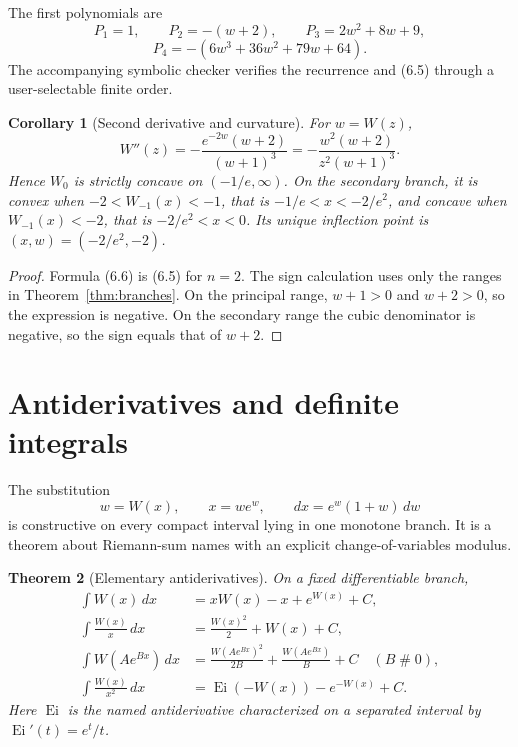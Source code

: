 \documentclass[11pt]{article}
\newtheorem{theorem}{Theorem}[section]
\newtheorem{corollary}[theorem]{Corollary}
\theoremstyle{definition}
\newcommand{\apart}{\mathrel{\#}}
\newcommand{\Ei}{\operatorname{Ei}}
\begin{document}
The first polynomials are
\[
 P_1=1,\qquad P_2=-(w+2),\qquad
 P_3=2w^2+8w+9,
\]
\[
 P_4=-(6w^3+36w^2+79w+64).
\]
The accompanying symbolic checker verifies the recurrence and (6.5) through a
user-selectable finite order.

\begin{corollary}[Second derivative and curvature]\label{cor:curvature}
For \(w=W(z)\),
\[
 W''(z)=-\frac{e^{-2w}(w+2)}{(w+1)^3}
       =-\frac{w^2(w+2)}{z^2(w+1)^3}.
 \tag{6.6}
\]
Hence \(W_0\) is strictly concave on \((-1/e,\infty)\).  On the secondary
branch, it is convex when \(-2<W_{-1}(x)<-1\), that is
\(-1/e<x<-2/e^2\), and concave when
\(W_{-1}(x)<-2\), that is \(-2/e^2<x<0\).  Its unique inflection point is
\((x,w)=(-2/e^2,-2)\).
\end{corollary}

\begin{proof}
Formula (6.6) is (6.5) for \(n=2\).  The sign calculation uses only the
ranges in Theorem~\ref{thm:branches}.  On the principal range, \(w+1>0\) and
\(w+2>0\), so the expression is negative.  On the secondary range the cubic
denominator is negative, so the sign equals that of \(w+2\).
\end{proof}

\section{Antiderivatives and definite integrals}\label{sec:integrals}

The substitution
\[
 w=W(x),\qquad x=we^w,
 \qquad dx=e^w(1+w)\,dw
 \tag{7.1}
\]
is constructive on every compact interval lying in one monotone branch.  It is
a theorem about Riemann-sum names with an explicit change-of-variables modulus.

\begin{theorem}[Elementary antiderivatives]\label{thm:antiderivatives}
On a fixed differentiable branch,
\begin{align}
 \int W(x)\,dx
 &=xW(x)-x+e^{W(x)}+C,
 \tag{7.2}\\
 \int \frac{W(x)}x\,dx
 &=\frac{W(x)^2}{2}+W(x)+C,
 \tag{7.3}\\
 \int W(Ae^{Bx})\,dx
 &=\frac{W(Ae^{Bx})^2}{2B}+\frac{W(Ae^{Bx})}{B}+C
 \quad(B\apart0),
 \tag{7.4}\\
 \int \frac{W(x)}{x^2}\,dx
 &=\Ei(-W(x))-e^{-W(x)}+C.
 \tag{7.5}
\end{align}
Here \(\Ei\) is the named antiderivative characterized on a separated interval
by \(\Ei'(t)=e^t/t\).
\end{theorem}
\end{document}
